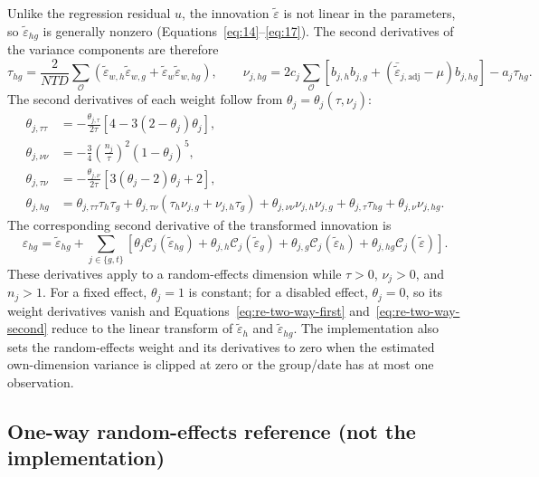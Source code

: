 \documentclass[12pt]{article}
\begin{document}
Unlike the regression residual $u$, the innovation $\tilde{\varepsilon}$ is not linear in the parameters, so $\tilde{\varepsilon}_{hg}$ is generally nonzero (Equations~\ref{eq:14}--\ref{eq:17}). The second derivatives of the variance components are therefore
\begin{equation}
\tau_{hg}=\frac{2}{NTD}\sum_{\mathcal O}\left(\tilde{\varepsilon}_{w,h}\tilde{\varepsilon}_{w,g}+\tilde{\varepsilon}_{w}\tilde{\varepsilon}_{w,hg}\right),\qquad
\nu_{j,hg}=2c_j\sum_{\mathcal O}\left[b_{j,h}b_{j,g}+(\bar{\tilde{\varepsilon}}_{j,\mathrm{adj}}-\mu)b_{j,hg}\right]-a_j\tau_{hg}.
\label{eq:re-two-way-variance-second}
\end{equation}
The second derivatives of each weight follow from $\theta_j=\theta_j(\tau,\nu_j)$:
\begin{align}
\theta_{j,\tau\tau}
&=-\frac{\theta_{j,\tau}}{2\tau}\left[4-3(2-\theta_j)\theta_j\right],\\
\theta_{j,\nu\nu}
&=-\frac{3}{4}\left(\frac{n_j}{\tau}\right)^2(1-\theta_j)^5,\\
\theta_{j,\tau\nu}
&=-\frac{\theta_{j,\nu}}{2\tau}\left[3(\theta_j-2)\theta_j+2\right],\\
\theta_{j,hg}
&=\theta_{j,\tau\tau}\tau_h\tau_g
+\theta_{j,\tau\nu}(\tau_h\nu_{j,g}+\nu_{j,h}\tau_g)
+\theta_{j,\nu\nu}\nu_{j,h}\nu_{j,g}
+\theta_{j,\tau}\tau_{hg}+\theta_{j,\nu}\nu_{j,hg}.
\label{eq:re-two-way-theta-second}
\end{align}
The corresponding second derivative of the transformed innovation is
\begin{equation}
\varepsilon_{hg}=\tilde{\varepsilon}_{hg}+\sum_{j\in\{g,t\}}\left[\theta_j\mathcal C_j(\tilde{\varepsilon}_{hg})+\theta_{j,h}\mathcal C_j(\tilde{\varepsilon}_g)+\theta_{j,g}\mathcal C_j(\tilde{\varepsilon}_h)+\theta_{j,hg}\mathcal C_j(\tilde{\varepsilon})\right].
\label{eq:re-two-way-second}
\end{equation}
These derivatives apply to a random-effects dimension while $\tau>0$, $\nu_j>0$, and $n_j>1$. For a fixed effect, $\theta_j=1$ is constant; for a disabled effect, $\theta_j=0$, so its weight derivatives vanish and Equations~\ref{eq:re-two-way-first} and~\ref{eq:re-two-way-second} reduce to the linear transform of $\tilde{\varepsilon}_h$ and $\tilde{\varepsilon}_{hg}$. The implementation also sets the random-effects weight and its derivatives to zero when the estimated own-dimension variance is clipped at zero or the group/date has at most one observation.

\subsection{One-way random-effects reference (not the implementation)}
\end{document}
